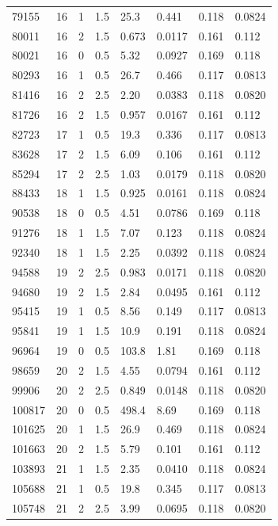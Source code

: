 \documentclass[preview]{standalone}
\begin{document}
{{{\begin{tabular}{L{1.2cm}C{1.2cm} C{0.3cm}C{0.5cm} C{1.4cm}C{1.4cm} C{1.4cm}C{1.4cm}}
  79155  &    16  & 1     & 1.5 &  25.3  & 0.441  & 0.118 &  0.0824   \\ 
  80011  &    16  & 2     & 1.5 &  0.673  & 0.0117  & 0.161 &  0.112   \\ 
  80021  &    16  & 0     & 0.5 &  5.32  & 0.0927  & 0.169 &  0.118   \\ 
  80293  &    16  & 1     & 0.5 &  26.7  & 0.466  & 0.117 &  0.0813   \\ 
  81416  &    16  & 2     & 2.5 &  2.20  & 0.0383  & 0.118 &  0.0820   \\ 
  81726  &    16  & 2     & 1.5 &  0.957  & 0.0167  & 0.161 &  0.112   \\ 
  82723  &    17  & 1     & 0.5 &  19.3  & 0.336  & 0.117 &  0.0813   \\ 
  83628  &    17  & 2     & 1.5 &  6.09  & 0.106  & 0.161 &  0.112   \\ 
  85294  &    17  & 2     & 2.5 &  1.03  & 0.0179  & 0.118 &  0.0820   \\ 
  88433  &    18  & 1     & 1.5 &  0.925  & 0.0161  & 0.118 &  0.0824   \\ 
  90538  &    18  & 0     & 0.5 &  4.51  & 0.0786  & 0.169 &  0.118   \\ 
  91276  &    18  & 1     & 1.5 &  7.07  & 0.123  & 0.118 &  0.0824   \\ 
  92340  &    18  & 1     & 1.5 &  2.25  & 0.0392  & 0.118 &  0.0824   \\ 
  94588  &    19  & 2     & 2.5 &  0.983  & 0.0171  & 0.118 &  0.0820   \\ 
  94680  &    19  & 2     & 1.5 &  2.84  & 0.0495  & 0.161 &  0.112   \\ 
  95415  &    19  & 1     & 0.5 &  8.56  & 0.149  & 0.117 &  0.0813   \\ 
  95841  &    19  & 1     & 1.5 &  10.9  & 0.191  & 0.118 &  0.0824   \\ 
  96964  &    19  & 0     & 0.5 &  103.8  & 1.81  & 0.169 &  0.118   \\ 
  98659  &    20  & 2     & 1.5 &  4.55  & 0.0794  & 0.161 &  0.112   \\ 
  99906  &    20  & 2     & 2.5 &  0.849  & 0.0148  & 0.118 &  0.0820   \\ 
  100817  &    20  & 0     & 0.5 &  498.4  & 8.69  & 0.169 &  0.118   \\ 
  101625  &    20  & 1     & 1.5 &  26.9  & 0.469  & 0.118 &  0.0824   \\ 
  101663  &    20  & 2     & 1.5 &  5.79  & 0.101  & 0.161 &  0.112   \\ 
  103893  &    21  & 1     & 1.5 &  2.35  & 0.0410  & 0.118 &  0.0824   \\ 
  105688  &    21  & 1     & 0.5 &  19.8  & 0.345  & 0.117 &  0.0813   \\ 
  105748  &    21  & 2     & 2.5 &  3.99  & 0.0695  & 0.118 &  0.0820   \\ 
\hline 
\end{tabular} 

}}}
\end{document}
